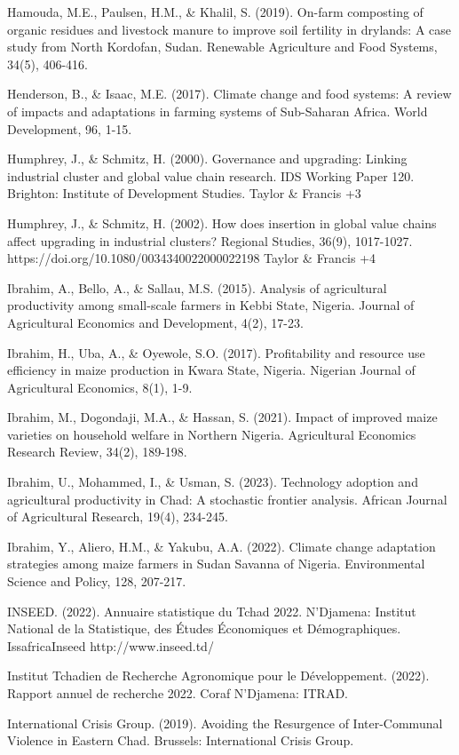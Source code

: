 \documentclass[12pt,oneside]{report}
\begin{document}
Hamouda, M.E., Paulsen, H.M., \& Khalil, S. (2019). On-farm composting of organic residues and livestock manure to improve soil fertility in drylands: A case study from North Kordofan, Sudan. Renewable Agriculture and Food Systems, 34(5), 406-416.

Henderson, B., \& Isaac, M.E. (2017). Climate change and food systems: A review of impacts and adaptations in farming systems of Sub-Saharan Africa. World Development, 96, 1-15.

Humphrey, J., \& Schmitz, H. (2000). Governance and upgrading: Linking industrial cluster and global value chain research. IDS Working Paper 120. Brighton: Institute of Development Studies. Taylor \& Francis +3

Humphrey, J., \& Schmitz, H. (2002). How does insertion in global value chains affect upgrading in industrial clusters? Regional Studies, 36(9), 1017-1027. https://doi.org/10.1080/0034340022000022198 Taylor \& Francis +4

Ibrahim, A., Bello, A., \& Sallau, M.S. (2015). Analysis of agricultural productivity among small-scale farmers in Kebbi State, Nigeria. Journal of Agricultural Economics and Development, 4(2), 17-23.

Ibrahim, H., Uba, A., \& Oyewole, S.O. (2017). Profitability and resource use efficiency in maize production in Kwara State, Nigeria. Nigerian Journal of Agricultural Economics, 8(1), 1-9.

Ibrahim, M., Dogondaji, M.A., \& Hassan, S. (2021). Impact of improved maize varieties on household welfare in Northern Nigeria. Agricultural Economics Research Review, 34(2), 189-198.

Ibrahim, U., Mohammed, I., \& Usman, S. (2023). Technology adoption and agricultural productivity in Chad: A stochastic frontier analysis. African Journal of Agricultural Research, 19(4), 234-245.

Ibrahim, Y., Aliero, H.M., \& Yakubu, A.A. (2022). Climate change adaptation strategies among maize farmers in Sudan Savanna of Nigeria. Environmental Science and Policy, 128, 207-217.

INSEED. (2022). Annuaire statistique du Tchad 2022. N'Djamena: Institut National de la Statistique, des Études Économiques et Démographiques. IssafricaInseed http://www.inseed.td/

Institut Tchadien de Recherche Agronomique pour le Développement. (2022). Rapport annuel de recherche 2022. Coraf N'Djamena: ITRAD.

International Crisis Group. (2019). Avoiding the Resurgence of Inter-Communal Violence in Eastern Chad. Brussels: International Crisis Group.
\end{document}
